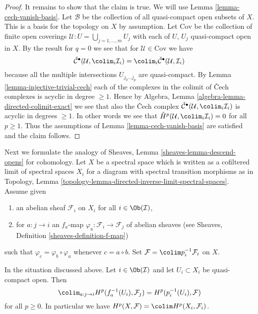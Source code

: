 \begin{proof}
\medskip\noindent
It remains to show that the claim is true. We will use
Lemma \ref{lemma-cech-vanish-basis}.
Let $\mathcal{B}$ be the collection of all quasi-compact open
subsets of $X$. This is a basis for the topology on $X$ by assumption.
Let $\text{Cov}$ be the collection of finite open coverings
$\mathcal{U} : U = \bigcup_{j = 1, \ldots, m} U_j$ with each
of $U$, $U_j$ quasi-compact open in $X$. By the result for $q = 0$
we see that for $\mathcal{U} \in \text{Cov}$ we have
$$
\check{\mathcal{C}}^\bullet(\mathcal{U}, \colim_i \mathcal{I}_i)
=
\colim_i \check{\mathcal{C}}^\bullet(\mathcal{U}, \mathcal{I}_i)
$$
because all the multiple intersections $U_{j_0 \ldots j_p}$
are quasi-compact. By Lemma \ref{lemma-injective-trivial-cech}
each of the complexes in the colimit of {\v C}ech complexes is
acyclic in degree $\geq 1$. Hence by
Algebra, Lemma \ref{algebra-lemma-directed-colimit-exact}
we see that also the {\v C}ech complex
$\check{\mathcal{C}}^\bullet(\mathcal{U}, \colim_i \mathcal{I}_i)$
is acyclic in degrees $\geq 1$. In other words we see that
$\check{H}^p(\mathcal{U},  \colim_i \mathcal{I}_i) = 0$
for all $p \geq 1$. Thus the assumptions of
Lemma \ref{lemma-cech-vanish-basis} are satisfied and the claim follows.
\end{proof}

\noindent
Next we formulate the analogy of
Sheaves, Lemma \ref{sheaves-lemma-descend-opens}
for cohomology.
Let $X$ be a spectral space which is written as a cofiltered limit
of spectral spaces $X_i$ for a diagram with spectral transition morphisms
as in
Topology, Lemma \ref{topology-lemma-directed-inverse-limit-spectral-spaces}.
Assume given
\begin{enumerate}
\item an abelian sheaf $\mathcal{F}_i$ on $X_i$ for all
$i \in \Ob(\mathcal{I})$,
\item for $a : j \to i$ an $f_a$-map
$\varphi_a : \mathcal{F}_i \to \mathcal{F}_j$ of abelian sheaves (see
Sheaves, Definition \ref{sheaves-definition-f-map})
\end{enumerate}
such that $\varphi_c = \varphi_b \circ \varphi_a$
whenever $c = a \circ b$. Set $\mathcal{F} = \colim p_i^{-1}\mathcal{F}_i$
on $X$.

\begin{lemma}
\label{lemma-colimit}
In the situation discussed above.
Let $i \in \Ob(\mathcal{I})$ and let $U_i \subset X_i$ be quasi-compact open.
Then
$$
\colim_{a : j \to i} H^p(f_a^{-1}(U_i), \mathcal{F}_j) =
H^p(p_i^{-1}(U_i), \mathcal{F})
$$
for all $p \geq 0$. In particular we have
$H^p(X, \mathcal{F}) = \colim H^p(X_i, \mathcal{F}_i)$.
\end{lemma}

